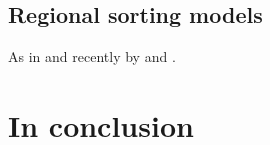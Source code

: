 \documentclass[fleqn,10pt]{SelfArx} %
\begin{document}
\subsection{Regional sorting models}

As in \citet{Bayer2004, Bayer2007a} and recently by \citet{Wang2016} and \citet{Bernasco2016}.

\section{In conclusion}


\printbibliography

\end{document}
